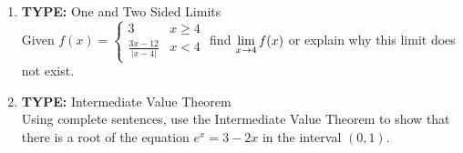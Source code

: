 \documentclass[11pt,fleqn]{article}
\begin{document}
\begin{enumerate}
\item \textbf{TYPE:} One and Two Sided Limits\\
Given $f(x) =
  \begin{cases}
  3 & x \ge 4  \\
    \frac{3x - 12}{|x-4|} & x < 4 
  \end{cases}$ find $\displaystyle \lim_{x \to 4} f(x)$ or explain why this limit
  does not exist. 
  \vfill
 \item \textbf{TYPE:} Intermediate Value Theorem\\
 Using complete sentences, use the Intermediate
Value Theorem to show that there is a root of the equation $e^x = 3 -
2x$ in the interval $(0, 1)$. 
  \vfill
\end{enumerate}
\end{document}
